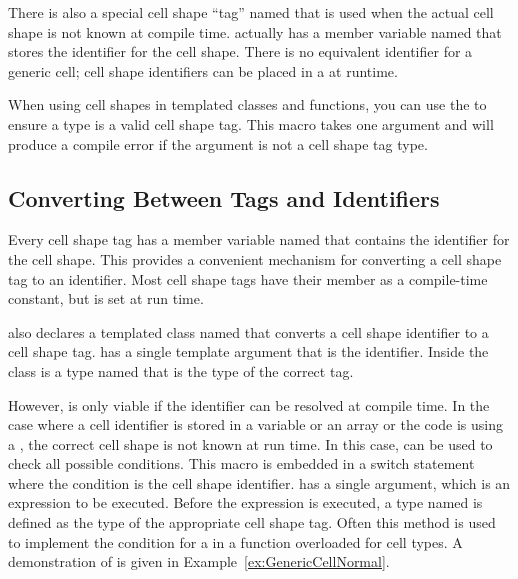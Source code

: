 There is also a special cell shape ``tag'' named 
that is used when the actual cell shape is not known at compile time.
 actually has a member variable named
 that stores the identifier for the cell shape. There is no
equivalent identifier for a generic cell; cell shape identifiers can be
placed in a  at runtime.

When using cell shapes in templated classes and functions, you can use the
 to ensure a type is a valid cell
shape tag. This macro takes one argument and will produce a compile error
if the argument is not a cell shape tag type.

\subsection{Converting Between Tags and Identifiers}

Every cell shape tag has a member variable named  that
contains the identifier for the cell shape. This provides a convenient
mechanism for converting a cell shape tag to an identifier. Most cell shape
tags have their  member as a compile-time constant, but
 is set at run time.

 also declares a templated class named
 that converts a cell shape identifier to a cell
shape tag.  has a single template argument
that is the identifier. Inside the class is a type named 
that is the type of the correct tag.


However,  is only viable if the identifier
can be resolved at compile time. In the case where a cell identifier is
stored in a variable or an array or the code is using a
, the correct cell shape is not known
at run time. In this case,  can be
used to check all possible conditions. This macro is embedded in a switch
statement where the condition is the cell shape identifier.
 has a single argument, which is an
expression to be executed. Before the expression is executed, a type named
 is defined as the type of the appropriate cell
shape tag. Often this method is used to implement the condition for a
 in a function overloaded for cell
types. A demonstration of  is given in
Example~\ref{ex:GenericCellNormal}.

